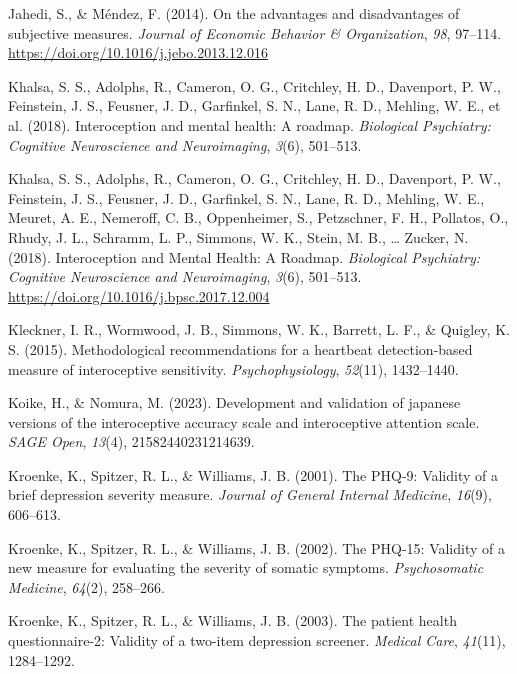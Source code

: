 \documentclass[
  man,
  floatsintext,
  longtable,
  nolmodern,
  notxfonts,
  notimes,
  colorlinks=true,linkcolor=blue,citecolor=blue,urlcolor=blue]{apa7}
\newlength{\cslhangindent}
\newenvironment{CSLReferences}[2] %
 {\begin{list}{}{%
  \setlength{\itemindent}{0pt}
  \setlength{\leftmargin}{0pt}
  \setlength{\parsep}{0pt}
  \ifodd #1
   \setlength{\leftmargin}{\cslhangindent}
   \setlength{\itemindent}{-1\cslhangindent}
  \fi
  \setlength{\itemsep}{#2\baselineskip}}}
 {\end{list}}
\begin{document}
\begin{CSLReferences}{1}{0}
Jahedi, S., \& Méndez, F. (2014). On the advantages and disadvantages of
subjective measures. \emph{Journal of Economic Behavior \&
Organization}, \emph{98}, 97--114.
\url{https://doi.org/10.1016/j.jebo.2013.12.016}

Khalsa, S. S., Adolphs, R., Cameron, O. G., Critchley, H. D., Davenport,
P. W., Feinstein, J. S., Feusner, J. D., Garfinkel, S. N., Lane, R. D.,
Mehling, W. E., et al. (2018). Interoception and mental health: A
roadmap. \emph{Biological Psychiatry: Cognitive Neuroscience and
Neuroimaging}, \emph{3}(6), 501--513.

Khalsa, S. S., Adolphs, R., Cameron, O. G., Critchley, H. D., Davenport,
P. W., Feinstein, J. S., Feusner, J. D., Garfinkel, S. N., Lane, R. D.,
Mehling, W. E., Meuret, A. E., Nemeroff, C. B., Oppenheimer, S.,
Petzschner, F. H., Pollatos, O., Rhudy, J. L., Schramm, L. P., Simmons,
W. K., Stein, M. B., \ldots{} Zucker, N. (2018). Interoception and
Mental Health: A Roadmap. \emph{Biological Psychiatry: Cognitive
Neuroscience and Neuroimaging}, \emph{3}(6), 501--513.
\url{https://doi.org/10.1016/j.bpsc.2017.12.004}

Kleckner, I. R., Wormwood, J. B., Simmons, W. K., Barrett, L. F., \&
Quigley, K. S. (2015). Methodological recommendations for a heartbeat
detection-based measure of interoceptive sensitivity.
\emph{Psychophysiology}, \emph{52}(11), 1432--1440.

Koike, H., \& Nomura, M. (2023). Development and validation of japanese
versions of the interoceptive accuracy scale and interoceptive attention
scale. \emph{SAGE Open}, \emph{13}(4), 21582440231214639.

Kroenke, K., Spitzer, R. L., \& Williams, J. B. (2001). The PHQ-9:
Validity of a brief depression severity measure. \emph{Journal of
General Internal Medicine}, \emph{16}(9), 606--613.

Kroenke, K., Spitzer, R. L., \& Williams, J. B. (2002). The PHQ-15:
Validity of a new measure for evaluating the severity of somatic
symptoms. \emph{Psychosomatic Medicine}, \emph{64}(2), 258--266.

Kroenke, K., Spitzer, R. L., \& Williams, J. B. (2003). The patient
health questionnaire-2: Validity of a two-item depression screener.
\emph{Medical Care}, \emph{41}(11), 1284--1292.


\end{CSLReferences}
\end{document}
